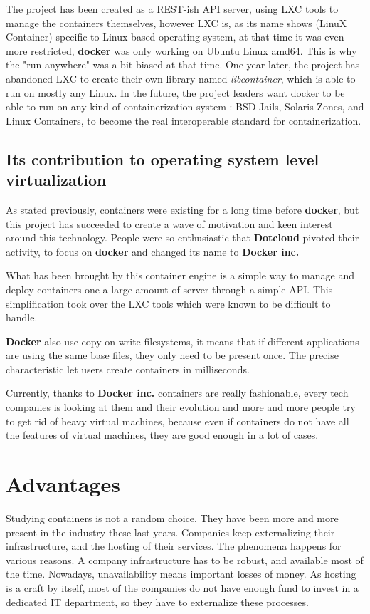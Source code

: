 The project has been created as a REST-ish API server, using LXC tools to
manage the containers themselves, however LXC is, as its name shows (LinuX
Container) specific to Linux-based operating system, at that time it was even
more restricted, \textbf{docker} was only working on Ubuntu Linux amd64. This
is why the "run anywhere" was a bit biased at that time. One year later, the
project has abandoned LXC to create their own library named
\textit{libcontainer}, which is able to run on mostly any Linux. In the future,
the project leaders want docker to be able to run on any kind of
containerization system : BSD Jails, Solaris Zones, and Linux Containers, to
become the real interoperable standard for containerization.

\subsection{Its contribution to operating system level virtualization}

As stated previously, containers were existing for a long time before
\textbf{docker}, but this project has succeeded to create a wave of motivation
and keen interest around this technology. People were so enthusiastic that
\textbf{Dotcloud} pivoted their activity, to focus on \textbf{docker} and
changed its name to \textbf{Docker inc.}

What has been brought by this container engine is a simple way to manage and
deploy containers one a large amount of server through a simple API. This
simplification took over the LXC tools which were known to be difficult to
handle.

\textbf{Docker} also use copy on write filesystems, it means that if different
applications are using the same base files, they only need to be present once.
The precise characteristic let users create containers in milliseconds.

Currently, thanks to \textbf{Docker inc.} containers are really fashionable,
every tech companies is looking at them and their evolution and more and more
people try to get rid of heavy virtual machines, because even if containers do
not have all the features of virtual machines, they are good enough in a lot of
cases.

\section{Advantages}

Studying containers is not a random choice. They have been more and more
present in the industry these last years. Companies keep externalizing their
infrastructure, and the hosting of their services. The phenomena happens for
various reasons. A company infrastructure has to be robust, and available most
of the time. Nowadays, unavailability means important losses of money. As
hosting is a craft by itself, most of the companies do not have enough fund to
invest in a dedicated IT department, so they have to externalize these
processes.


